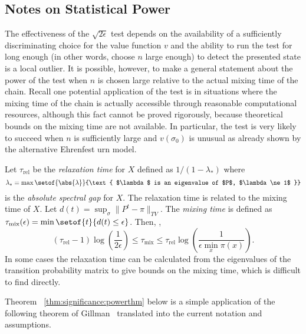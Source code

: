 \documentclass[12pt]{article}
\begin{document}
\subsection*{Notes on Statistical Power}

The effectiveness of the \( \sqrt{2\epsilon} \) test depends on the
availability of a sufficiently discriminating choice for the value
function \( v \) and the ability to run the test for long enough (in
other words, choose \( n \) large enough) to detect the presented state
is a local outlier.  It is possible, however, to make a general
statement about the power of the test when \( n \) is chosen large
relative to the actual mixing time of the chain.  Recall one potential
application of the test is in situations where the mixing time of the
chain is actually accessible through reasonable computational resources,
although this fact cannot be proved rigorously, because theoretical
bounds on the mixing time are not available.  In particular, the test is
very likely to succeed when \( n \) is sufficiently large and \( v(\sigma_0)
\) is unusual as already shown by the alternative Ehrenfest urn model.

\begin{remark}
    Let \( \tau_{\text{rel}} \) be the \emph{relaxation time}%
    for \( X \) defined as \( 1/ (1-\lambda_*) \) where
    \[
        \lambda_* = \max \setof{\abs{\lambda}}{\text{ $\lambda$ is an
        eigenvalue of $P$, $\lambda \ne 1$ }}
    \] is the \emph{absolute spectral gap} for \( X \).  The relaxation
    time is related to the mixing time of \( X \).  Let \( d(t) = \sup_{\sigma}
    \| P^t - \pi \|_{TV} \).  The \emph{mixing time} is defined as \(
    \tau_{\text{mix}}(\epsilon) = \min\setof{t}{d(t) \le \epsilon} \).
    Then,
    \cite[Theorems 12.3, 12.4]{levin09},
    \[
        (\tau_{\text{rel}}-1) \log \left( \frac{1}{2\epsilon} \right)
        \le \tau_{\text{mix}} \le \tau_{\text{rel}} \log \left( \frac{1}
        {\epsilon \min_x \pi(x)} \right).
    \] In some cases the relaxation time can be calculated from the
    eigenvalues of the transition probability matrix to give bounds on
    the mixing time, which is difficult to find directly.
\end{remark}

Theorem~%
\ref{thm:significance:powerthm} below is a simple application of the
following theorem of Gillman~%
\cite[Theorem 2.1]{gillman98} translated into the current notation and
assumptions.
\end{document}
